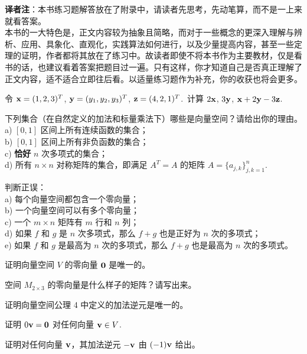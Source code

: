 \textbf{译者注}：本书练习题解答放在了附录中，请读者先思考，先动笔算，而不是一上来就看答案。
\\
本书的一大特色是，正文内容较为抽象且简略，而对于一些概念的更深入理解与辨析、应用、具象化、直观化，实践算法如何进行，以及少量提高内容，甚至一些定理的证明，作者都将其放在了练习中。故读者即使不将本书作为主要教材，仅是看书的话，也建议看着答案把题目过一遍。只有这样，你才知道自己是否真正理解了正文内容，适不适合立即往后看。以适量练习题作为补充，你的收获也将会更多。
\begin{problemset}
\item \label{ex:01-01-01} 令 $\mathbf{x} = (1, 2, 3)^T$, $\mathbf{y} = (y_1, y_2, y_3)^T$, $\mathbf{z} = (4, 2, 1)^T$.~计算 $2\mathbf{x}$, $3\mathbf{y}$, $\mathbf{x} + 2\mathbf{y} - 3\mathbf{z}$.
\item \label{ex:01-01-02} 下列集合（在自然定义的加法和标量乘法下）哪些是向量空间？请给出你的理由。
\\
a) $[0, 1]$ 区间上所有连续函数的集合；
\\
b) $[0, 1]$ 区间上所有非负函数的集合；
\\
c) \textbf{恰好} $n$ 次多项式的集合；
\\
d) 所有 $n \times n$ 对称矩阵的集合，即满足 $A^T = A$ 的矩阵 $A = \{a_{j,k}\}_{j,k=1}^n $.  %
\item \label{ex:01-01-03} 判断正误：
\\
a) 每个向量空间都包含一个零向量；
\\
b) 一个向量空间可以有多个零向量；
\\
c) 一个 $m \times n$ 矩阵有 $m$ 行和 $n$ 列；
\\
d) 如果 $f$ 和 $g$ 是 $n$ 次多项式，那么 $f+g$ 也是正好为 $n$ 次的多项式；
\\
e) 如果 $f$ 和 $g$ 是最高为 $n$ 次的多项式，那么 $f+g$ 也是最高为 $n$ 次的多项式。
\item \label{ex:01-01-04} 证明向量空间 $V$ 的零向量 $\mathbf{0}$ 是唯一的。
\item \label{ex:01-01-05} 空间 $M_{2 \times 3}$ 的零向量是什么样子的矩阵？请写出来。
\item \label{ex:01-01-06} 证明向量空间公理 4 中定义的加法逆元是唯一的。
\item \label{ex:01-01-07} 证明 $0 \mathbf{v} = \mathbf{0}$ 对任何向量 $\mathbf{v} \in V$.~
\item \label{ex:01-01-08} 证明对任何向量 $\mathbf{v}$，其加法逆元 $-\mathbf{v}$ 由 $(-1)\mathbf{v}$ 给出。


\end{problemset}

